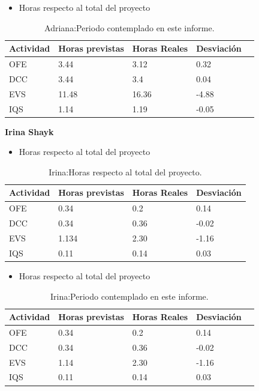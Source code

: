 \begin{itemize}
\item Horas respecto al total del proyecto
\end{itemize}
\begin{table}[H]
\begin{center}
\begin{tabular}{ l l l l l }
  Actividad & Horas previstas & Horas Reales & Desviación \\ \hline \hline
    OFE & 3.44 & 3.12 & 0.32 \\ \hline
    DCC & 3.44 & 3.4 & 0.04 \\ \hline
    EVS & 11.48 & 16.36 & -4.88 \\ \hline
    IQS & 1.14 & 1.19 & -0.05 \\ \hline
\end{tabular}
\caption{Adriana:Periodo contemplado en este informe.}
\label{tab:Adriana:PeriodoContempladoInforme}
\end{center}
\end{table}

\textbf{Irina Shayk}
\begin{itemize}
\item Horas respecto al total del proyecto
\end{itemize}
\begin{table}[H]
\begin{center}
\begin{tabular}{ l l l l }
	Actividad & Horas previstas & Horas Reales & Desviación \\ \hline \hline
  	OFE & 0.34 & 0.2 & 0.14\\ \hline
  	DCC & 0.34 & 0.36 & -0.02 \\ \hline
  	EVS & 1.134 & 2.30 & -1.16 \\ \hline
  	IQS & 0.11 & 0.14 & 0.03 \\ \hline
\end{tabular}
\caption{Irina:Horas respecto al total del proyecto.}
\label{tab:Irina:HorasTotalInforme}
\end{center}
\end{table}

\begin{itemize}
\pagebreak
\item Horas respecto al total del proyecto
\end{itemize}
\begin{table}[H]
\begin{center}
\begin{tabular}{ l l l l l }
  Actividad & Horas previstas & Horas Reales & Desviación \\ \hline \hline
    OFE & 0.34 & 0.2 & 0.14\\ \hline
    DCC & 0.34 & 0.36 & -0.02 \\ \hline
    EVS & 1.14 & 2.30 & -1.16 \\ \hline
    IQS & 0.11 & 0.14 & 0.03 \\ \hline
\end{tabular}
\caption{Irina:Periodo contemplado en este informe.}
\label{tab:Irina:PeriodoContempladoInforme}
\end{center}
\end{table}

